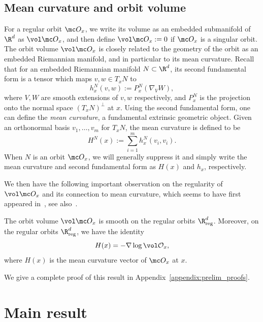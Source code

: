 \documentclass[twoside,a4paper,11pt]{article}
\newcommand{\reg}{\mathrm{reg}}
\theoremstyle{plain}
\begin{document}
\subsection{Mean curvature and orbit volume}
For a regular orbit $\mc O_x$, we write its volume as an 
embedded submanifold of $\R^d$ as 
$\vol \mc O_x$, and then define $\vol \mc O_x := 0$ 
if $\mc O_x$ is a singular orbit.
The orbit volume $\vol \mc O_x$ is closely related to
the geometry of the orbit as an embedded Riemannian
manifold, and in particular to its mean curvature.
Recall that for an embedded Riemannian manifold $N \subset \R^d$,
its second fundamental form
is a tensor which maps $v, w \in T_xN$ to 
$$
h^N_x(v, w) := P^N_x(\nabla_{V} W ),
$$ where $V, W$ are smooth extensions
of $v, w$ respectively, and $P^N_x$ is the projection
onto the normal space $(T_x N)^{\perp}$ at $x$.
Using the second fundamental form, one can define
the {\it mean curvature}, a fundamental
extrinsic geometric object.
Given an orthonormal basis $v_1, \ldots, v_m$ 
for $T_xN$,
the mean curvature is defined to be
$$
H^N(x) := \sum_{i =1 }^m h_x^N(v_i, v_i).
$$ When $N$ is an orbit $\mc O_x$, we will generally
suppress it and simply write the mean curvature
and second fundamental form as $H(x)$ and $h_x$, respectively.

We then have the following important observation on the regularity
 of $\vol \mc O_x$ and its connection to mean curvature, which seems
 to have first appeared in~\cite{carne1990geometry}, see also~\cite{pacini2003mean}.
\begin{prop}\label{prop:log_volume_mean_curvature}
The orbit volume
$\vol \mc O_x$ is smooth on the regular orbits $\R^d_{\reg}$.
Moreover, on the regular orbits $\R^d_{\reg}$, we have the identity
\begin{equation}
\label{eqn:mc-entropy}
H(x)= 
-\nabla \log \vol \mathcal{O}_x,
\end{equation}
where $H(x)$ is the mean curvature vector of $\mc O_x$ at $x$.
\end{prop}

We give a complete proof
of this result
in Appendix~\ref{appendix:prelim_proofs}.



\section{Main result}
\label{sec:main_results}
\end{document}
